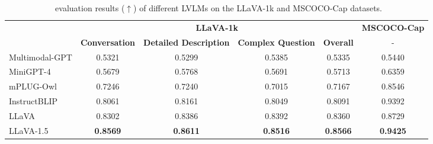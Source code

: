 \begin{table}[t]
    \centering \small
    \begin{tabular}{lccccc}
        \toprule
            \bf  &  \multicolumn{4}{c}{\bf LLaVA-1k} & \bf MSCOCO-Cap \\
         \bf  & \bf Conversation & \bf Detailed Description & \bf Complex Question & \bf Overall & -\\
        \midrule
            Multimodal-GPT& 0.5321&0.5299&0.5385&0.5335 & 0.5440\\

         MiniGPT-4 & 0.5679& 0.5768 & 0.5691 & 0.5713 & 0.6359\\
        mPLUG-Owl  & 0.7246 & 0.7240 & 0.7015& 0.7167 & 0.8546\\
         InstructBLIP & 0.8061& 0.8161& 0.8049& 0.8091 & {0.9392}\\ 


                  LLaVA & 0.8302& 0.8386&0.8392 & 0.8360& 0.8729\\
        LLaVA-1.5& \bf{ 0.8569}&\bf{ 0.8611}&\bf{ 0.8516} &  \bf{0.8566} & \bf 0.9425\\
        


        \bottomrule
    \end{tabular}
    \caption{\ours\ evaluation results ($\uparrow$) of different LVLMs on the LLaVA-1k and MSCOCO-Cap datasets.}
    \label{tab:llavadataset1k}
\end{table}


